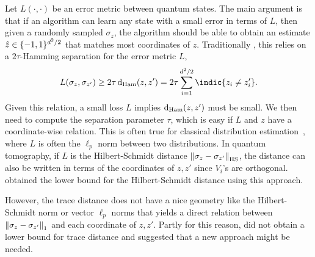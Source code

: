 Let $L(\cdot, \cdot)$ be an error metric between quantum states.
The main argument is that if an algorithm can learn any state with a small error in terms of $L$, then given a randomly sampled $\sigma_z$, the algorithm should be able to obtain an estimate $\hat{z}\in\{-1,1\}^{d^2/2}$ that matches most coordinates of $z$. Traditionally \cite{yu1997assouad,duchi2013local}, this relies on a $2\tau$-Hamming separation for the error metric $L$,
\[
L(\sigma_z,\sigma_{z'})\ge 2\tau \ham{z}{z'}=2\tau\sum_{i=1}^{\dims^2/2}\indic{z_i\ne z_i'}.
\]
Given this relation, a small loss $L$ implies $\operatorname{d}_{\rm Ham}(z,z')$ must be small. We then need to compute the separation parameter $\tau$, which is easy if $L$ and $z$ have a coordinate-wise relation. This is often true for classical distribution estimation~\cite{duchi2013local,ACLST22iiuic}, where $L$ is often the $\ell_p$ norm between two distributions. In quantum tomography, if $L$ is the Hilbert-Schmidt distance ${\left\|\sigma_z-\sigma_{z'}\right\|}_{\text{HS}}$, the distance can also be written in terms of the coordinates of $z,z'$ since $V_i$'s are orthogonal. \cite{cai2016optimal} obtained the lower bound for the Hilbert-Schmidt distance using this approach.

However, the trace distance does not have a nice geometry like the Hilbert-Schmidt norm or vector $\ell_p$ norms that yields a direct relation between ${\left\|\sigma_z-\sigma_{z'}\right\|}_{1}$ and each coordinate of $z,z'$. 
Partly for this reason, \cite{cai2016optimal} did not obtain a lower bound for trace distance and suggested that a new approach might be needed.

